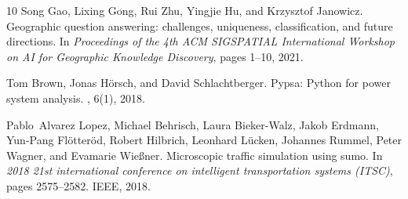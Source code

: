 \documentclass[sigconf]{acmart}
\begin{document}
\begin{thebibliography}{10}
Song Gao, Lixing Gong, Rui Zhu, Yingjie Hu, and Krzysztof Janowicz.
\newblock Geographic question answering: challenges, uniqueness, classification, and future directions.
\newblock In {\em Proceedings of the 4th ACM SIGSPATIAL International Workshop on AI for Geographic Knowledge Discovery}, pages 1--10, 2021.

Tom Brown, Jonas H{\"o}rsch, and David Schlachtberger.
\newblock Pypsa: Python for power system analysis.
, 6(1), 2018.

Pablo~Alvarez Lopez, Michael Behrisch, Laura Bieker-Walz, Jakob Erdmann, Yun-Pang Fl{\"o}tter{\"o}d, Robert Hilbrich, Leonhard L{\"u}cken, Johannes Rummel, Peter Wagner, and Evamarie Wie{\ss}ner.
\newblock Microscopic traffic simulation using sumo.
\newblock In {\em 2018 21st international conference on intelligent transportation systems (ITSC)}, pages 2575--2582. IEEE, 2018.

\end{thebibliography}
\end{document}

